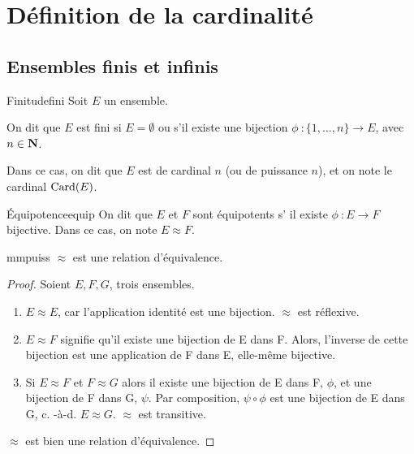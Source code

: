 \documentclass[a4paper,french,final]{memoir}
\begin{document}
\chapter{Définition de la cardinalité}
\section{Ensembles finis et infinis}

\begin{defb}{Finitude}{fini}
     Soit $E$ un ensemble. 
	    
	On dit que $E$ est fini si $E = \emptyset$ ou s'il existe une bijection $\phi~: \{1,\dots,n \} \to E$, avec $n \in \mathbf{N}$.

	Dans ce cas, on dit que $E$ est de cardinal $n$ (ou de puissance $n$), et on note le cardinal $\operatorname{Card}(E)$. 
\end{defb} 


\begin{defb}{\'Equipotence}{equip}
    On dit que $E$ et $F$ sont équipotents s' il existe $\phi~: E \to F$ bijective. Dans ce cas, on note $E \mathrel{\approx} F$. 
\end{defb}

\begin{theoremb}{}{mmpuiss}
    $ \mathrel{\approx}$ est une relation d'équivalence. 
\end{theoremb}
\begin{proof}
    Soient $E, F, G$, trois ensembles.
	\begin{enumerate} 
		\item $E \mathrel{\approx} E$, car l'application identité est une bijection. $\mathrel{\approx}$ est réflexive.
		\item $E \mathrel{\approx} F$ signifie qu'il existe une bijection de E dans F. Alors, l'inverse de cette bijection est une application de F dans E, elle-même bijective.
		\item Si $E \mathrel{\approx} F$ et $F \mathrel{\approx} G$ alors il existe une bijection de E dans F, $\phi$, et une bijection de F dans G, $\psi$. Par composition, $\psi\circ\phi$ est une bijection de E dans G, c. -à-d. $E \mathrel{\approx} G$. $\mathrel{\approx}$ est transitive. 
	\end{enumerate}
	$\mathrel{\approx}$ est bien une relation d'équivalence.
\end{proof}
\end{document}
